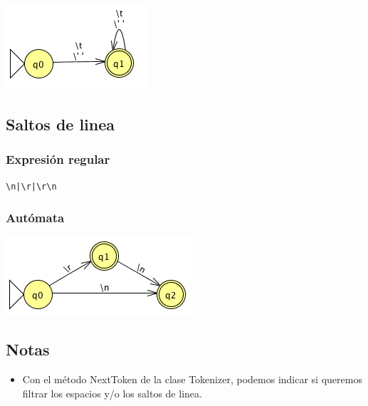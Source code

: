                 \includegraphics[scale=.7]{../Design/jflap/Espacio.png}
                
        \subsection{Saltos de linea}
        
            \subsubsection{Expresión regular}
            
                \begin{lstlisting}[language=Perl]
\n|\r|\r\n
                \end{lstlisting}
                
            \subsubsection{Autómata}
         
                \includegraphics[scale=.7]{../Design/jflap/Salto_de_linea.png}
            
        \subsection{Notas}
        
            \begin{itemize}
            
                \item Con el método NextToken de la clase Tokenizer, podemos indicar si queremos filtrar los espacios y/o los saltos de linea.
            
            \end{itemize}
            
